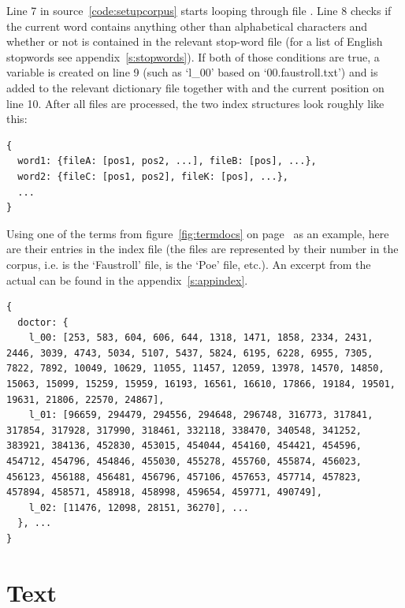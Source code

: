 Line 7 in source~\ref{code:setupcorpus} starts looping through file . Line 8 checks if the current word  contains anything other than alphabetical characters and whether or not  is contained in the relevant stop-word file  (for a list of English stopwords see appendix~\ref{s:stopwords}). If both of those conditions are true, a variable  is created on line 9 (such as `l\_00' based on `00.faustroll.txt') and  is added to the relevant dictionary file  together with  and the current position  on line 10. After all files are processed, the two index structures look roughly like this:

\begin{verbatim}
{
  word1: {fileA: [pos1, pos2, ...], fileB: [pos], ...},
  word2: {fileC: [pos1, pos2], fileK: [pos], ...},
  ...
}
\end{verbatim}

Using one of the terms from figure~\ref{fig:termdocs} on page~\pageref{fig:termdocs} as an example, here are their entries in the index file (the files are represented by their number in the corpus, i.e.  is the `Faustroll' file,  is the `Poe' file, etc.). An excerpt from the actual  can be found in the appendix~\ref{s:appindex}.

\label{c:pos}
\begin{verbatim}
{
  doctor: {
    l_00: [253, 583, 604, 606, 644, 1318, 1471, 1858, 2334, 2431, 2446, 3039, 4743, 5034, 5107, 5437, 5824, 6195, 6228, 6955, 7305, 7822, 7892, 10049, 10629, 11055, 11457, 12059, 13978, 14570, 14850, 15063, 15099, 15259, 15959, 16193, 16561, 16610, 17866, 19184, 19501, 19631, 21806, 22570, 24867],
    l_01: [96659, 294479, 294556, 294648, 296748, 316773, 317841, 317854, 317928, 317990, 318461, 332118, 338470, 340548, 341252, 383921, 384136, 452830, 453015, 454044, 454160, 454421, 454596, 454712, 454796, 454846, 455030, 455278, 455760, 455874, 456023, 456123, 456188, 456481, 456796, 457106, 457653, 457714, 457823, 457894, 458571, 458918, 458998, 459654, 459771, 490749],
    l_02: [11476, 12098, 28151, 36270], ...
  }, ...
}
\end{verbatim}


\section{Text}
\label{s:algorithms}

